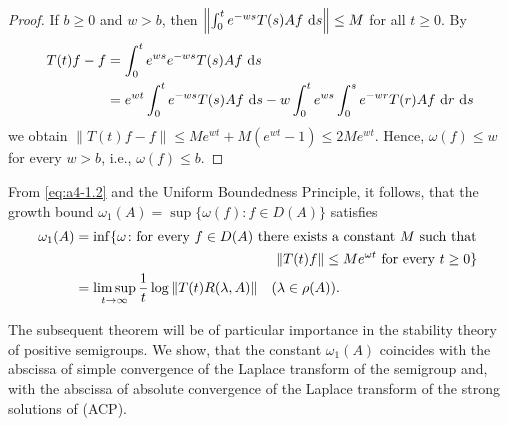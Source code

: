 \begin{proof}
\noindent
If $b \geq 0$ and $w > b$, then $\left\|\int_{0}^{t} e^{-w s} T(s)Af\,\mathop{}\!\mathrm{d}{s}\right\| \leq M$ for all $t \geq 0$. 
By 
\begin{align*}
T(t)f - f &= \int_{0}^{t} e^{w s} e^{-w s} T(s)Af \,\mathop{}\!\mathrm{d}{s}\\
&= e^{wt}\int_0^t e^{-ws} T(s)Af\,\mathop{}\!\mathrm{d}{s} - w\int_0^te^{ws}\int_0^s e^{-wr} T(r)Af\, \mathop{}\!\mathrm{d}{r}\,\mathop{}\!\mathrm{d}{s}
\end{align*}
we obtain $\|T(t)f-f\| \leq Me^{w t} + M(e^{w t} - 1)
\le 2Me^{wt}$. 
Hence, $\omega(f)\le w$ for every $w > b$, i.e., $\omega(f) \leq b$.
\end{proof}

From \eqref{eq:a4-1.2} and the Uniform Boundedness Principle, it follows, that the growth bound $\omega_{1}(A) = \sup\{\omega(f) \colon f \in D(A)\}$ satisfies
\begin{align}\label{eq:a4-1.3}
\omega_1(A) &= \inf\{\omega \colon \text{for every } f \in D(A) \text{ there exists a constant } M \text{ such that }\\
& \hskip 2 true in \|T(t)f\| \leq Me^{\omega t} \text{ for every } t \geq 0\} \notag\\
&=
\limsup_{t \to \infty} \frac{1}{t} \log\|T(t)R(\lambda,A)\| \quad (\lambda \in \rho(A)). 
\notag
\end{align}

The subsequent theorem will be of particular importance in the stability theory of positive semigroups.
We show, that the constant $\omega_{1}(A)$ coincides with the abscissa of simple convergence of the Laplace transform of the semigroup and, with the abscissa of absolute convergence of the Laplace transform of the strong solutions of (ACP).

